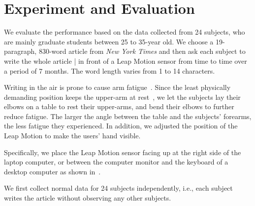 \section{Experiment and Evaluation}
\label{sec:results}

We evaluate the performance based on the data collected from 24 subjects, who are mainly graduate students between 25 to 35-year old. We choose a 19-paragraph, 830-word article from \textit{New York Times} and then ask each subject to write the whole article  | in front of a Leap Motion sensor from time to time over a period of 7 months. The word length varies from 1 to 14 characters. 

Writing in the air is prone to cause arm fatigue~\cite{Consumed_Endurance_fatigue_CHI_2014}. Since
the least physically demanding position keeps the upper-arm
at rest~\cite{Cockburn_AirPointing_2011HCS}, we let the subjects lay their elbows on a table
to rest their upper-arms, and bend their elbows to further
reduce fatigue. The larger the angle between the table and
the subjects' forearms, the less fatigue they experienced. In
addition, we adjusted the position of the Leap Motion to make
the users' hand visible.

Specifically, we place the Leap Motion sensor facing up at the right side of the laptop computer, or between the computer monitor and the keyboard of a desktop computer as shown in~. 

We first collect normal data for 24 subjects independently, i.e., each subject writes the article without observing any other subjects.  



